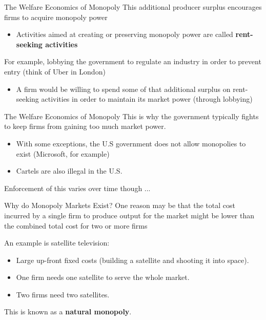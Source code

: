 \documentclass{beamer}
\begin{document}
\begin{frame}{The Welfare Economics of Monopoly}
  This additional producer surplus encourages firms to acquire monopoly power

  \begin{itemize}
    \item Activities aimed at creating or preserving monopoly power are called \textbf{rent-seeking activities}
  \end{itemize}

  \bigskip
  For example, lobbying the government to regulate an industry in order to prevent entry (think of Uber in London)

  \begin{itemize}
    \item A firm would be willing to spend some of that additional surplus on rent-seeking activities in order to maintain its market power (through lobbying)
  \end{itemize}
\end{frame}

\begin{frame}{The Welfare Economics of Monopoly}
  This is why the government typically fights to keep firms from gaining too much market power.
  \begin{itemize}
    \item With some exceptions, the U.S government does not allow monopolies to exist (Microsoft, for example)
    
    \item Cartels are also illegal in the U.S.
  \end{itemize}

  \bigskip Enforcement of this varies over time though ...
\end{frame}

\begin{frame}{Why do Monopoly Markets Exist?}
  One reason may be that the total cost incurred by a single firm to produce output for the market might be lower than the combined total cost for two or more firms
  
  \bigskip 
  An example is satellite television:
  \begin{itemize}
    \item Large up-front fixed costs (building a satellite and shooting it into space).
    \item One firm needs one satellite to serve the whole market.
    \item Two firms need two satellites.
  \end{itemize}

  \bigskip
  This is known as a \textbf{natural monopoly}.
\end{frame}
\end{document}
